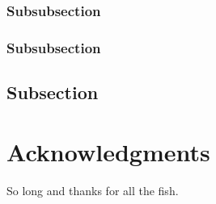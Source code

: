 \documentclass[fleqn,10pt]{wlpeerj} %
\begin{document}
\lipsum[11] %

\subsubsection*{Subsubsection}

\lipsum[12] %

\subsubsection*{Subsubsection}

\lipsum[14] %

\subsection*{Subsection}

\lipsum[15-20] %

\section*{Acknowledgments}

So long and thanks for all the fish.


\fi
\end{document}
